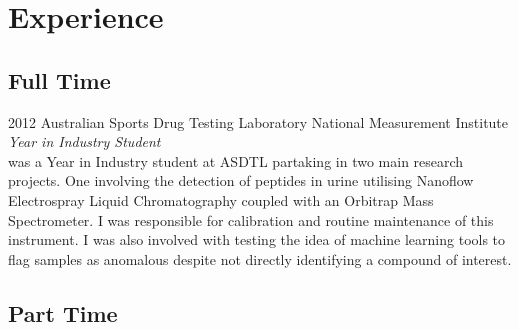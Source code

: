 \documentclass[]{friggeri-cv} %
\begin{document}
\section{Experience}

\subsection{Full Time}

\begin{entrylist}


\entry
{2012}
{Australian Sports Drug Testing Laboratory}
{National Measurement Institute}
{\emph{Year in Industry Student} \\
 was a Year in Industry student at ASDTL partaking in two main research projects. One involving the detection of peptides in urine utilising Nanoflow Electrospray Liquid Chromatography coupled with an Orbitrap Mass Spectrometer. I was responsible for calibration and routine maintenance of this instrument. I was also involved with testing the idea of machine learning tools to flag samples as anomalous despite not directly identifying a compound of interest.}


\end{entrylist}

\subsection{Part Time}
\end{document}
